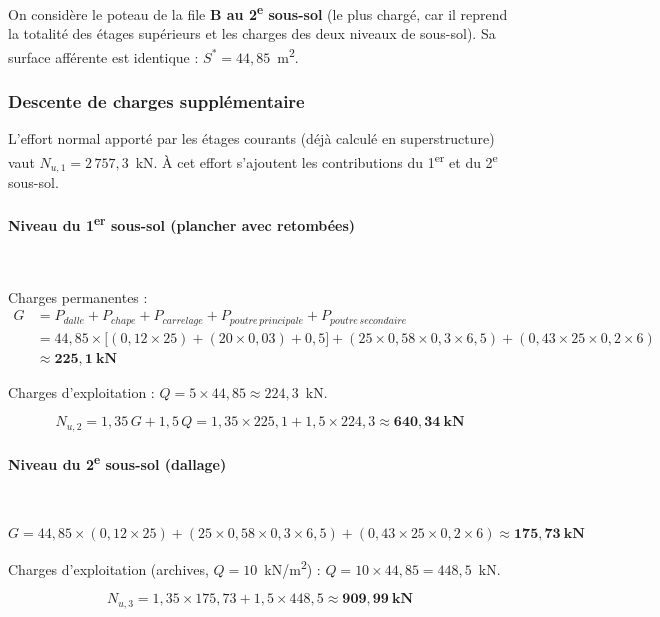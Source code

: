 On considère le poteau de la file \textbf{B au 2\textsuperscript{e} sous-sol} (le plus chargé, car il reprend la totalité des étages supérieurs et les charges des deux niveaux de sous-sol). Sa surface afférente est identique : $S^* = 44{,}85$~m\textsuperscript{2}.

\subsubsection{Descente de charges supplémentaire}

L'effort normal apporté par les étages courants (déjà calculé en superstructure) vaut $N_{u,1} = 2\,757{,}3$~kN. À cet effort s'ajoutent les contributions du 1\textsuperscript{er} et du 2\textsuperscript{e} sous-sol.

\paragraph{Niveau du 1\textsuperscript{er} sous-sol (plancher avec retombées)}~

Charges permanentes :
\begin{align*}
G &= P_{dalle} + P_{chape} + P_{carrelage} + P_{poutre\,principale} + P_{poutre\,secondaire} \\
&= 44{,}85 \times \big[(0{,}12 \times 25) + (20 \times 0{,}03) + 0{,}5\big] + (25 \times 0{,}58 \times 0{,}3 \times 6{,}5) + (0{,}43 \times 25 \times 0{,}2 \times 6) \\
&\approx \mathbf{225{,}1~\text{kN}}
\end{align*}

Charges d'exploitation : $Q = 5 \times 44{,}85 \approx 224{,}3$~kN.

\[
N_{u,2} = 1{,}35 \, G + 1{,}5 \, Q = 1{,}35 \times 225{,}1 + 1{,}5 \times 224{,}3 \approx \mathbf{640{,}34~\text{kN}}
\]

\paragraph{Niveau du 2\textsuperscript{e} sous-sol (dallage)}~

\[
G = 44{,}85 \times (0{,}12 \times 25) + (25 \times 0{,}58 \times 0{,}3 \times 6{,}5) + (0{,}43 \times 25 \times 0{,}2 \times 6) \approx \mathbf{175{,}73~\text{kN}}
\]

Charges d'exploitation (archives, $Q = 10$~kN/m\textsuperscript{2}) : $Q = 10 \times 44{,}85 = 448{,}5$~kN.

\[
N_{u,3} = 1{,}35 \times 175{,}73 + 1{,}5 \times 448{,}5 \approx \mathbf{909{,}99~\text{kN}}
\]

